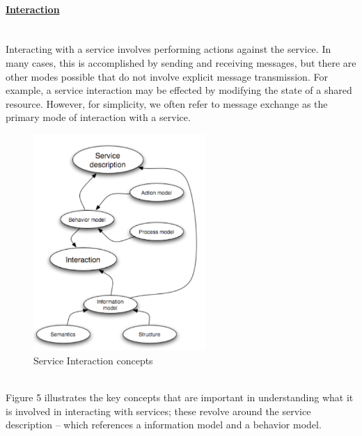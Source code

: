 \documentclass[10pt,a4paper]{article}
\newcommand{\myparagraph}[1]{\paragraph{\uline{#1}}\mbox{}\\[0.05in]}
\begin{document}
 \myparagraph{Interaction}
Interacting with a service involves performing actions against the service. In many cases, this is accomplished by sending and receiving messages, but there are other modes possible that do not involve explicit message transmission. For example, a service interaction may be effected by modifying the state of a shared resource. However, for simplicity, we often refer to message exchange as the primary mode of interaction with a service.
\begin{figure}[h!]
 \hfill \includegraphics[width=185pt]{images/interaction}\hspace*{\fill}
  \caption{Service Interaction concepts}
  \label{fig:interaction}
\end{figure}  \\
Figure 5 illustrates the key concepts that are important in understanding what it is involved in interacting with services; these revolve around the service description – which references a information model and a behavior model.
\end{document}
